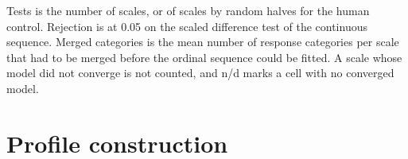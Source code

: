 \begin{table}[pos=!htbp]
\begin{tabular*}{\textwidth}{@{\extracolsep{\fill}}llcccccc@{}}
\bottomrule
\end{tabular*}
\par\smallskip
\scriptsize Tests is the number of scales, or of scales by random halves for the human control. Rejection is at 0.05 on the scaled difference test of the continuous sequence. Merged categories is the mean number of response categories per scale that had to be merged before the ordinal sequence could be fitted. A scale whose model did not converge is not counted, and n/d marks a cell with no converged model.
\end{table}

\clearpage

\section{Profile construction}
\label{app:f}

